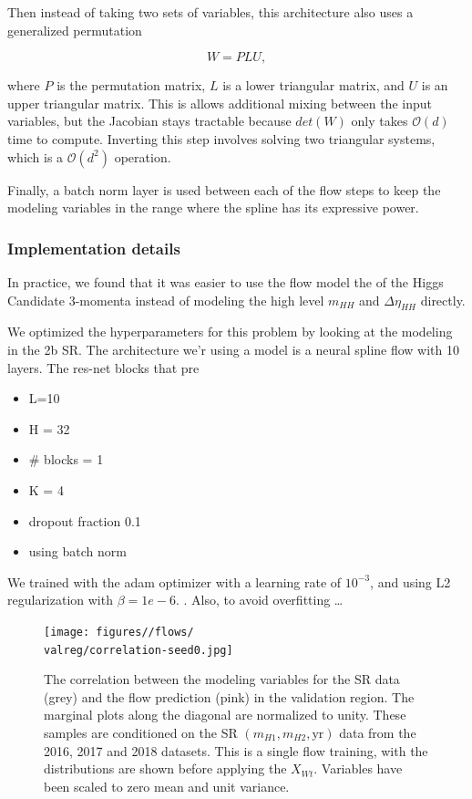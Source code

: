 Then instead of taking two sets of variables, this architecture also uses a generalized permutation 

\begin{equation}
	W = P L U,
\end{equation}

where $P$ is the permutation matrix, $L$ is a lower triangular matrix, and $U$ is an upper triangular matrix. %
This is allows additional mixing between the input variables, but the Jacobian stays tractable because $det(W)$ only takes $\mathcal{O}(d)$ time to compute. 
Inverting this step involves solving two triangular systems, which is a $\mathcal{O}(d^2)$ operation. %

Finally, a batch norm layer is used between each of the flow steps to keep the modeling variables in the range where the spline has its expressive power.

\subsubsection{Implementation details}

In practice, we found that it was easier to use the flow model the of the Higgs Candidate 3-momenta instead of modeling the high level $m_{HH}$ and $\Delta \eta_{HH}$ directly. 

We optimized the hyperparameters for this problem by looking at the modeling in the 2b SR.
The architecture we'r using a model is a neural spline flow with 10 layers. The res-net blocks that pre
\begin{itemize}
	\item L=10 
	\item H = 32
	\item \# blocks = 1
	\item K = 4
	\item dropout fraction 0.1
	\item using batch norm
\end{itemize}

We trained with the adam optimizer with a learning rate of $10^{-3}$, and using L2 regularization with $\beta = 1e-6$.
.
Also, to avoid overfitting \ldots

\begin{figure}[hbt]
    \centering
    \texttt{[image: figures//flows/\\valreg/correlation-seed0.jpg]} 
    \caption{The correlation between the modeling variables for the SR data (grey) and the flow prediction (pink) in the \vallabel validation region.
    The marginal plots along the diagonal are normalized to unity.
    These samples are conditioned on the SR $(m_{H1}, m_{H2}, \text{yr} )$ data from the 2016, 2017 and 2018 datasets.
    This is a single flow training, with the distributions are shown before applying the $X_{Wt}$.
    Variables have been scaled to zero mean and unit variance.}
    \label{fig:2d-correlation-\valreg}
\end{figure}

